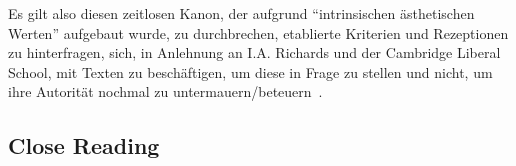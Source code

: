 Es gilt also diesen zeitlosen Kanon, der aufgrund ``intrinsischen ästhetischen Werten'' aufgebaut wurde, zu durchbrechen, etablierte Kriterien und Rezeptionen zu hinterfragen, %
sich, in Anlehnung an I.A. Richards und der Cambridge Liberal School, mit Texten zu beschäftigen, um diese in Frage zu stellen und nicht, um ihre Autorität nochmal zu untermauern/beteuern~\cite{North2013}.

\begin{comment}
1. Intro
  * Ziel von Feministischen Lektüren: zugrunde liegende Machtstrukturen in Werken und deren Rezeption aufzudecken
    ** androzentrische Perspektive der Literatur:
       *** Männer in Mittelpunkt (als Figuren)
       *** von Männern gemacht
       *** an Männer gerichtet
  * Wie erreicht? Durch eine Pluralität der Lektüren und Close Reading
ohne das ouevre Nerudas nicht als ganzes in Frage stellen
exemplarische Lektüren: Poetisierung bestimmter Heteronormativen Perspektiven
gehört historisiert; nicht als zeitlos darzustellen

* durch Sprache (und Literatur dann) bestimmte identitäre Zuschreibung geprägt: Sprache formt unser Gehirn, Gedanken, Weltanschauung, Denkweise, Kathegorien --> im Kopf behalten wenn man mit "Lektüren" umgeht
\end{comment}

\subsection{Close Reading}


